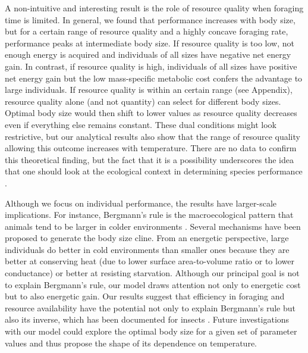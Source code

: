 A non-intuitive and interesting result is the role of resource quality when foraging time is limited.
In general, we found that performance increases with body size, but for a certain range of resource quality and a highly concave foraging rate, performance peaks at intermediate body size.
If resource quality is too low, not enough energy is acquired and individuals of all sizes have negative net energy gain.
In contrast, if resource quality is high, individuals of all sizes have positive net energy gain but the low mass-specific metabolic cost confers the advantage to large individuals.
If resource quality is within an certain range (see Appendix), resource quality alone (and not quantity) can select for different body sizes.
Optimal body size would then shift to lower values as resource quality decreases even if everything else remains constant.
These dual conditions might look restrictive, but our analytical results also show that the range of resource quality allowing this outcome increases with temperature.
There are no data to confirm this theoretical finding, but the fact that it is a possibility underscores the idea that one should look at the ecological context in determining species performance \citep{Sears2015}.

Although we focus on individual performance, the results have larger-scale implications.
For instance, Bergmann's rule is the macroecological pattern that animals tend to be larger in colder environments \citep{Bergmann1847, Blackburn1999}.
Several mechanisms have been proposed to generate the body size cline.
From an energetic perspective, large individuals do better in cold environments than smaller ones because they are better at conserving heat (due to lower surface area-to-volume ratio or to lower conductance) or better at resisting starvation.
Although our principal goal is not to explain Bergmann's rule, our model draws attention not only to energetic cost but to also energetic gain.
Our results suggest that efficiency in foraging and resource availability have the potential not only to explain Bergmann's rule but also its inverse, which has been documented for insects \citep{Cushman1993, Loder1997,Blackburn1999}.
Future investigations with our model could explore the optimal body size for a given set of parameter values and thus propose the shape of its dependence on temperature.


